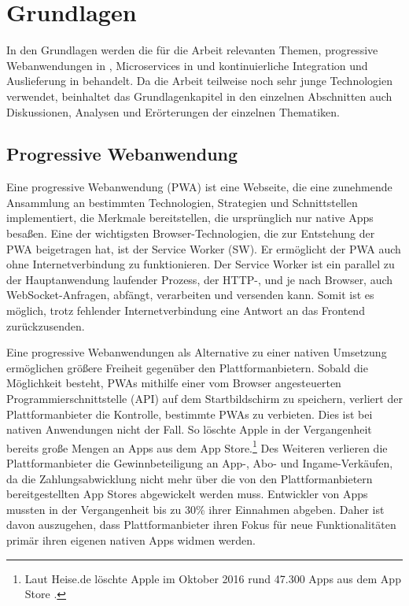 \chapter{Grundlagen}
\label{chap:grundlagen}
In den Grundlagen werden die für die Arbeit relevanten Themen, progressive Webanwendungen in ,
Microservices in  und kontinuierliche Integration und Auslieferung
in  behandelt. Da die Arbeit teilweise noch
sehr junge Technologien verwendet, beinhaltet das Grundlagenkapitel in den einzelnen Abschnitten
auch Diskussionen, Analysen und Erörterungen der einzelnen Thematiken.

\section{Progressive Webanwendung}
\label{sec:progressivewebanwendung}
Eine progressive Webanwendung (PWA) ist eine Webseite, die eine zunehmende Ansammlung
an bestimmten Technologien, Strategien und Schnittstellen implementiert,
die Merkmale bereitstellen, die ursprünglich nur native Apps besaßen. \cite{WikiPWA}
Eine der wichtigsten Browser-Technologien, die zur Entstehung der PWA beigetragen hat,
ist der Service Worker (SW). Er ermöglicht der PWA auch ohne Internetverbindung zu funktionieren. Der 
Service Worker ist ein parallel zu der Hauptanwendung laufender Prozess, der \mbox{HTTP-,} und je nach Browser,
auch WebSocket-Anfragen, abfängt, verarbeiten und versenden kann. Somit ist es möglich, trotz fehlender Internetverbindung
eine Antwort an das Frontend zurückzusenden.\cite{W3ServiceWorker}

Eine progressive Webanwendungen als Alternative zu einer nativen Umsetzung
ermöglichen größere Freiheit gegenüber den Plattformanbietern. Sobald die
Möglichkeit besteht, PWAs mithilfe einer vom Browser angesteuerten Programmierschnittstelle (API)
auf dem Startbildschirm zu speichern, verliert der Plattformanbieter die Kontrolle,
bestimmte PWAs zu verbieten. Dies ist bei nativen Anwendungen nicht der Fall. So löschte Apple in der Vergangenheit
bereits große Mengen an Apps aus dem App Store.\footnote{Laut Heise.de löschte Apple im Oktober
2016 rund 47.300 Apps aus dem App Store \cite{HeiseAppleLoeschtApps}.}
Des Weiteren verlieren die Plattformanbieter die Gewinnbeteiligung an App-, Abo- und Ingame-Verkäufen,
da die Zahlungsabwicklung nicht mehr über die von den Plattformanbietern bereitgestellten App Stores
abgewickelt werden muss. Entwickler von Apps mussten in der Vergangenheit bis zu 30\% 
ihrer Einnahmen abgeben.\cite{WinFutureEigenerAppStore} Daher ist davon auszugehen,
dass Plattformanbieter ihren Fokus für neue Funktionalitäten primär ihren eigenen
nativen Apps widmen werden.

